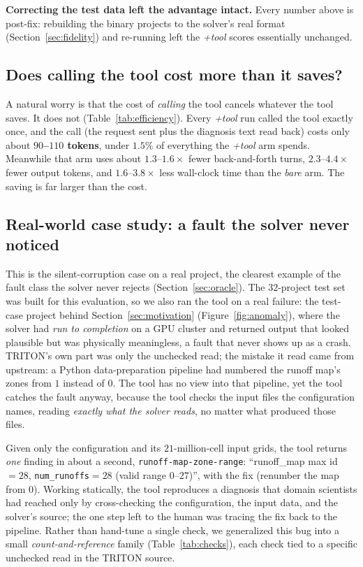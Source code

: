 \documentclass[conference]{IEEEtran}
\begin{document}
\noindent\textbf{Correcting the test data left the advantage intact.} Every number above is
post-fix: rebuilding the binary projects to the solver's real format (Section~\ref{sec:fidelity})
and re-running left the \emph{+tool} scores essentially unchanged.

\subsection{Does calling the tool cost more than it saves?}
A natural worry is that the cost of \emph{calling} the tool cancels whatever the tool saves. It
does not (Table~\ref{tab:efficiency}). Every \emph{+tool} run called the tool exactly once, and
the call (the request sent plus the diagnosis text read back) costs only about
\textbf{$90$--$110$ tokens}, under $1.5\%$ of everything the \emph{+tool} arm spends. Meanwhile that arm uses about $1.3$--$1.6\times$ fewer
back-and-forth turns, $2.3$--$4.4\times$ fewer output tokens, and $1.6$--$3.8\times$ less wall-clock
time than the \emph{bare} arm. The saving is far larger than the cost.

\subsection{Real-world case study: a fault the solver never noticed}
\label{sec:realworld}
This is the silent-corruption case on a real project, the clearest example of the fault
class the solver never rejects (Section~\ref{sec:oracle}). The $32$-project test set was built for
this evaluation, so we also ran the tool on a real failure: the test-case project behind
Section~\ref{sec:motivation} (Figure~\ref{fig:anomaly}), where the solver had \emph{run to
completion} on a GPU cluster and returned output that looked plausible but was physically
meaningless, a fault that never shows up as a crash. TRITON's own part was only the unchecked
read; the mistake it read came from upstream: a Python data-preparation pipeline had numbered
the runoff map's zones from $1$ instead of $0$. The tool has no view into that pipeline,
yet the tool catches the fault anyway, because the tool checks the input files the configuration
names, reading \emph{exactly what the solver reads}, no matter what produced those files.

Given only the configuration and its $21$-million-cell input grids, the tool returns \emph{one} finding
in about a second, \texttt{runoff-map-zone-range}: ``runoff\_map max id$=28$, \texttt{num\_runoffs}$=28$
(valid range $0$--$27$)'', with the fix (renumber the map from $0$). Working statically, the
tool reproduces a diagnosis that domain scientists had reached only by cross-checking the
configuration, the input data, and the solver's source; the one step left to the human was
tracing the fix back to the pipeline. Rather than hand-tune a single check, we
generalized this bug into a small \emph{count-and-reference} family (Table~\ref{tab:checks}),
each check tied to a specific unchecked read in the TRITON source.
\end{document}
